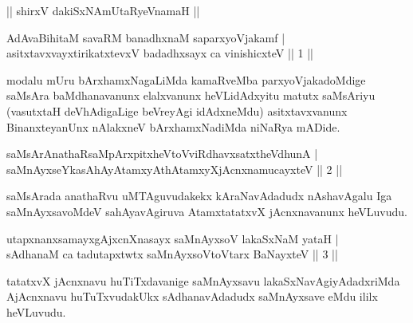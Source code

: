 \begin{center}
|| shirxV dakiSxNAmUtaRyeVnamaH ||
\end{center}


\begin{shl}
AdAvaBihitaM savaRM banadhxnaM saparxyoVjakamf |\\
asitxtavxvayxtirikatxtevxV badadhxsayx ca vinishicxteV \hfill || 1 ||
\end{shl}

\begin{artha}%
modalu mUru bArxhamxNagaLiMda kamaRveMba parxyoVjakadoMdige saMsAra baMdhanavanunx elalxvanunx heVLidAdxyitu matutx saMsAriyu (vasutxtaH deVhAdigaLige beVreyAgi idAdxneMdu) asitxtavxvanunx BinanxteyanUnx nAlakxneV bArxhamxNadiMda niNaRya mADide.
\end{artha}


\begin{shl}
saMsArAnathaRsaMpArxpitxheVtoVviRdhavxsatxtheV\s dhunA |\\
saMnAyxseYkasAhAyAtamxyAthAtamxyXjAcnxnamucayxteV \hfill || 2 ||
\end{shl}

\begin{artha}
saMsArada anathaRvu uMTAguvudakekx kAraNavAdadudx nAshavAgalu Iga saMnAyxsavoMdeV sahAyavAgiruva AtamxtatatxvX jAcnxnavanunx heVLuvudu.
\end{artha}


\begin{shl}
utapxnanxsamayxgAjxcnXnasayx saMnAyxsoV lakaSxNaM yataH |\\
sAdhanaM ca tadutapxtwtx saMnAyxsoV\s toV\s tarx BaNayxteV \hfill || 3 ||
\end{shl}

\begin{artha}
tatatxvX jAcnxnavu huTiTxdavanige saMnAyxsavu lakaSxNavAgiyAdadxriMda AjAcnxnavu huTuTxvudakUkx sAdhanavAdadudx saMnAyxsave eMdu ililx heVLuvudu.
\end{artha}


